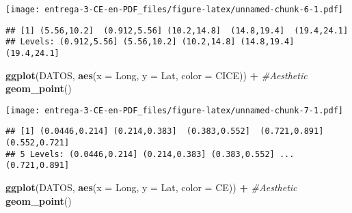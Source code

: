 \documentclass[
]{article}
\newenvironment{Shaded}{\begin{snugshade}}{\end{snugshade}}
\newcommand{\CommentTok}[1]{\textcolor[rgb]{0.56,0.35,0.01}{\textit{#1}}}
\newcommand{\DataTypeTok}[1]{\textcolor[rgb]{0.13,0.29,0.53}{#1}}
\newcommand{\DecValTok}[1]{\textcolor[rgb]{0.00,0.00,0.81}{#1}}
\newcommand{\KeywordTok}[1]{\textcolor[rgb]{0.13,0.29,0.53}{\textbf{#1}}}
\newcommand{\NormalTok}[1]{#1}
\newcommand{\OperatorTok}[1]{\textcolor[rgb]{0.81,0.36,0.00}{\textbf{#1}}}
\newcommand{\StringTok}[1]{\textcolor[rgb]{0.31,0.60,0.02}{#1}}
\begin{document}
\texttt{[image: entrega-3-CE-en-PDF\_files/figure-latex/unnamed-chunk-6-1.pdf]}

\begin{Shaded}
\end{Shaded}

\begin{verbatim}
## [1] (5.56,10.2]  (0.912,5.56] (10.2,14.8]  (14.8,19.4]  (19.4,24.1] 
## Levels: (0.912,5.56] (5.56,10.2] (10.2,14.8] (14.8,19.4] (19.4,24.1]
\end{verbatim}

\begin{Shaded}
\begin{Highlighting}[]
\KeywordTok{ggplot}\NormalTok{(DATOS, }\KeywordTok{aes}\NormalTok{(}\DataTypeTok{x =}\NormalTok{ Long, }\DataTypeTok{y =}\NormalTok{ Lat, }\DataTypeTok{color =}\NormalTok{ CICE)) }\OperatorTok{+}\StringTok{ }\CommentTok{#Aesthetic}
\StringTok{  }\KeywordTok{geom_point}\NormalTok{()}
\end{Highlighting}
\end{Shaded}

\texttt{[image: entrega-3-CE-en-PDF\_files/figure-latex/unnamed-chunk-7-1.pdf]}

\begin{Shaded}
\end{Shaded}

\begin{verbatim}
## [1] (0.0446,0.214] (0.214,0.383]  (0.383,0.552]  (0.721,0.891]  (0.552,0.721] 
## 5 Levels: (0.0446,0.214] (0.214,0.383] (0.383,0.552] ... (0.721,0.891]
\end{verbatim}

\begin{Shaded}
\begin{Highlighting}[]
\KeywordTok{ggplot}\NormalTok{(DATOS, }\KeywordTok{aes}\NormalTok{(}\DataTypeTok{x =}\NormalTok{ Long, }\DataTypeTok{y =}\NormalTok{ Lat, }\DataTypeTok{color =}\NormalTok{ CE)) }\OperatorTok{+}\StringTok{ }\CommentTok{#Aesthetic}
\StringTok{  }\KeywordTok{geom_point}\NormalTok{()}
\end{Highlighting}
\end{Shaded}
\end{document}
